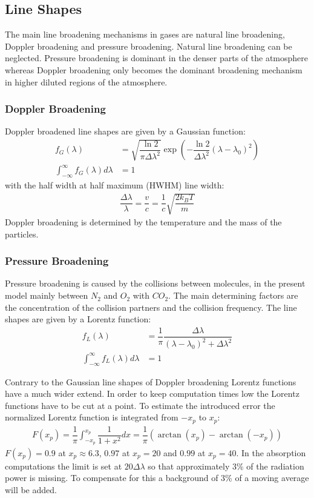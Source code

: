 \subsection{Line Shapes}

The main line broadening mechanisms in gases are natural line broadening, Doppler broadening and pressure broadening. Natural line broadening can be neglected. Pressure broadening is dominant in the denser parts of the atmosphere whereas Doppler broadening only becomes the dominant broadening mechanism in higher diluted regions of the atmosphere.

\subsubsection{Doppler Broadening}

Doppler broadened line shapes are given by a Gaussian function:
\begin{align}
	f_G(\lambda) &= \sqrt{\dfrac{\ln 2}{\pi \Delta \lambda^2}}
		\exp \left(- \dfrac{\ln 2}{\Delta \lambda^2}  \left(\lambda - \lambda_0\right)^2 \right) \\
			\int_{-\infty}^{\infty}  f_G(\lambda) d\lambda &= 1
\end{align}
with the half width at half maximum (HWHM) line width:
\begin{align}
\dfrac{\Delta \lambda}{\lambda} = \dfrac{v}{c} = \dfrac{1}{c} \sqrt{\dfrac{2 k_B T}{m}}
\end{align}
Doppler broadening is  determined by the temperature and the mass of the particles.

\subsubsection{Pressure Broadening}

Pressure broadening is caused by the collisions between molecules, in the present model mainly between $N_2$ and $O_2$ with $CO_2$. 
The main determining factors are the concentration of the collision partners and the collision frequency. The line shapes are given by a Lorentz function:
\begin{align}
	f_L(\lambda) &= \dfrac{1}{\pi} \dfrac{\Delta \lambda}{ (\lambda - \lambda_0)^2 + \Delta \lambda^2} \\
	\int_{-\infty}^{\infty}  f_L(\lambda) d\lambda &= 1
\end{align}

Contrary to the Gaussian line shapes of Doppler broadening Lorentz functions have a much wider extend. In order to keep computation times low the Lorentz functions have to be cut at a point. To estimate the introduced error the normalized Lorentz function is integrated from $-x_p$ to $x_p$:
\begin{align}
	F(x_p) = \dfrac{1}{\pi} \int_{-x_p}^{x_p} \dfrac{1}{1 + x^2} dx = \dfrac{1}{\pi} \left(\arctan(x_p) - \arctan(-x_p)\right)
\end{align}
$F(x_p) = 0.9$ at $x_p \approx 6.3$, $0.97$ at $x_p = 20$ and $0.99$ at $x_p = 40$. In the absorption computations the limit is set at  $20 \Delta \lambda$ so that approximately 3\% of the radiation power is missing. To compensate for this a background of 3\% of a moving average will be added.

